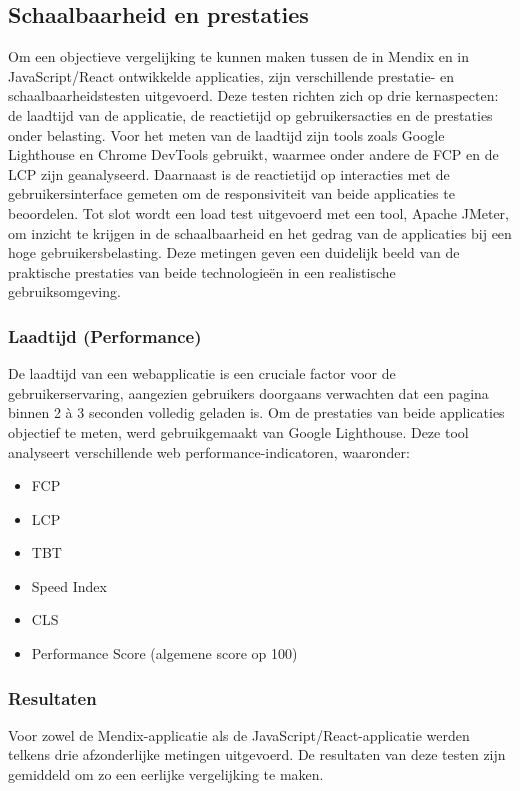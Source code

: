 \subsection{Schaalbaarheid en prestaties}
Om een objectieve vergelijking te kunnen maken tussen de in Mendix en in JavaScript/React ontwikkelde applicaties, zijn verschillende prestatie- en schaalbaarheidstesten uitgevoerd. Deze testen richten zich op drie kernaspecten: de laadtijd van de applicatie, de reactietijd op gebruikersacties en de prestaties onder belasting. Voor het meten van de laadtijd zijn tools zoals Google Lighthouse en Chrome DevTools gebruikt, waarmee onder andere de \gls{FCP} en de \gls{LCP} zijn geanalyseerd. Daarnaast is de reactietijd op interacties met de gebruikersinterface gemeten om de responsiviteit van beide applicaties te beoordelen. Tot slot wordt een load test uitgevoerd met een tool, Apache JMeter, om inzicht te krijgen in de schaalbaarheid en het gedrag van de applicaties bij een hoge gebruikersbelasting. Deze metingen geven een duidelijk beeld van de praktische prestaties van beide technologieën in een realistische gebruiksomgeving.

\subsubsection{Laadtijd (Performance)}
De laadtijd van een webapplicatie is een cruciale factor voor de gebruikerservaring, aangezien gebruikers doorgaans verwachten dat een pagina binnen 2 à 3 seconden volledig geladen is. Om de prestaties van beide applicaties objectief te meten, werd gebruikgemaakt van Google Lighthouse. Deze tool analyseert verschillende web performance-indicatoren, waaronder:
\begin{itemize}
    \item \gls{FCP}
    \item \gls{LCP}
    \item \gls{TBT}
    \item Speed Index
    \item \gls{CLS}
    \item Performance Score (algemene score op 100)
\end{itemize}

\subsubsection{Resultaten}

Voor zowel de Mendix-applicatie als de JavaScript/React-applicatie werden telkens drie afzonderlijke metingen uitgevoerd. De resultaten van deze testen zijn gemiddeld om zo een eerlijke vergelijking te maken.
\newpage
